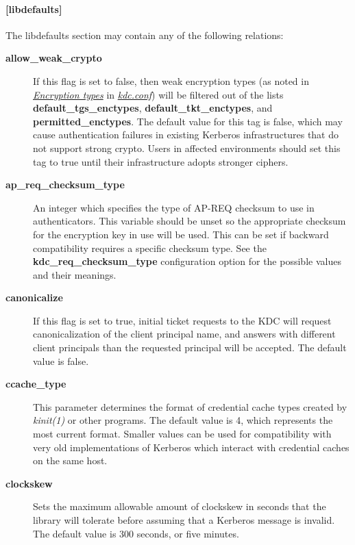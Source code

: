 \documentclass[letterpaper,10pt,english]{sphinxmanual}
\begin{document}
\paragraph{{[}libdefaults{]}}
\label{admin/conf_files/krb5_conf:libdefaults}\label{admin/conf_files/krb5_conf:id1}
The libdefaults section may contain any of the following relations:
\begin{description}
\item[{\textbf{allow\_weak\_crypto}}] \leavevmode
If this flag is set to false, then weak encryption types (as noted
in {\hyperref[admin/conf_files/kdc_conf:encryption-types]{\emph{Encryption types}}} in {\hyperref[admin/conf_files/kdc_conf:kdc-conf-5]{\emph{kdc.conf}}}) will be filtered
out of the lists \textbf{default\_tgs\_enctypes},
\textbf{default\_tkt\_enctypes}, and \textbf{permitted\_enctypes}.  The default
value for this tag is false, which may cause authentication
failures in existing Kerberos infrastructures that do not support
strong crypto.  Users in affected environments should set this tag
to true until their infrastructure adopts stronger ciphers.

\item[{\textbf{ap\_req\_checksum\_type}}] \leavevmode
An integer which specifies the type of AP-REQ checksum to use in
authenticators.  This variable should be unset so the appropriate
checksum for the encryption key in use will be used.  This can be
set if backward compatibility requires a specific checksum type.
See the \textbf{kdc\_req\_checksum\_type} configuration option for the
possible values and their meanings.

\item[{\textbf{canonicalize}}] \leavevmode
If this flag is set to true, initial ticket requests to the KDC
will request canonicalization of the client principal name, and
answers with different client principals than the requested
principal will be accepted.  The default value is false.

\item[{\textbf{ccache\_type}}] \leavevmode
This parameter determines the format of credential cache types
created by \emph{kinit(1)} or other programs.  The default value
is 4, which represents the most current format.  Smaller values
can be used for compatibility with very old implementations of
Kerberos which interact with credential caches on the same host.

\item[{\textbf{clockskew}}] \leavevmode
Sets the maximum allowable amount of clockskew in seconds that the
library will tolerate before assuming that a Kerberos message is
invalid.  The default value is 300 seconds, or five minutes.


\end{description}
\end{document}
